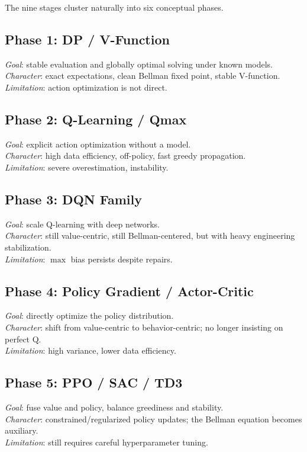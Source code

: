 The nine stages cluster naturally into six conceptual phases.

\subsection*{Phase 1: DP / V-Function}
\emph{Goal}: stable evaluation and globally optimal solving under known models.\\
\emph{Character}: exact expectations, clean Bellman fixed point, stable V-function.\\
\emph{Limitation}: action optimization is not direct.

\subsection*{Phase 2: Q-Learning / Qmax}
\emph{Goal}: explicit action optimization without a model.\\
\emph{Character}: high data efficiency, off-policy, fast greedy propagation.\\
\emph{Limitation}: severe overestimation, instability.

\subsection*{Phase 3: DQN Family}
\emph{Goal}: scale Q-learning with deep networks.\\
\emph{Character}: still value-centric, still Bellman-centered, but with heavy engineering stabilization.\\
\emph{Limitation}: $\max$ bias persists despite repairs.

\subsection*{Phase 4: Policy Gradient / Actor-Critic}
\emph{Goal}: directly optimize the policy distribution.\\
\emph{Character}: shift from value-centric to behavior-centric; no longer insisting on perfect Q.\\
\emph{Limitation}: high variance, lower data efficiency.

\subsection*{Phase 5: PPO / SAC / TD3}
\emph{Goal}: fuse value and policy, balance greediness and stability.\\
\emph{Character}: constrained/regularized policy updates; the Bellman equation becomes auxiliary.\\
\emph{Limitation}: still requires careful hyperparameter tuning.

